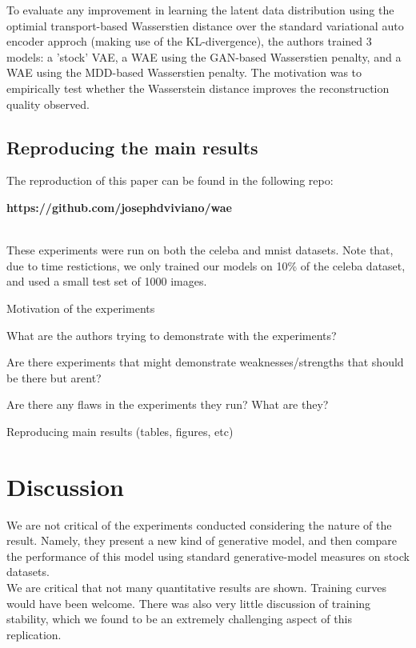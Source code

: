 \documentclass[12pt,english]{amsart}
\theoremstyle{definition}
\begin{document}
To evaluate any improvement in learning the latent data distribution using
the optimial transport-based Wasserstien distance over the standard variational
auto encoder approch (making use of the KL-divergence), the authors trained 3
models: a 'stock' VAE, a WAE using the GAN-based Wasserstien penalty, and a WAE
using the MDD-based Wasserstien penalty. The motivation was to empirically test
whether the Wasserstein distance improves the reconstruction quality observed.

\subsection{Reproducing the main results}

The reproduction of this paper can be found in the following repo:\\

\begin{center}\textbf{https://github.com/josephdviviano/wae}\end{center}\\

These experiments were run on both the celeba and mnist datasets. Note that,
due to time restictions, we only trained our models on 10\% of the celeba
dataset, and used a small test set of 1000 images.



    Motivation of the experiments


    What are the authors trying to demonstrate with the experiments?

    Are there experiments that might demonstrate weaknesses/strengths that should be there but arent?

    Are there any flaws in the experiments they run? What are they?

    Reproducing main results (tables, figures, etc)


\section{Discussion}

We are not critical of the experiments conducted considering the nature of the
result. Namely, they present a new kind of generative model, and then compare
the performance of this model using standard generative-model measures on stock
datasets. \\

We are critical that not many quantitative results are shown. Training curves
would have been welcome. There was also very little discussion of training
stability, which we found to be an extremely challenging aspect of this
replication. \\
\end{document}
